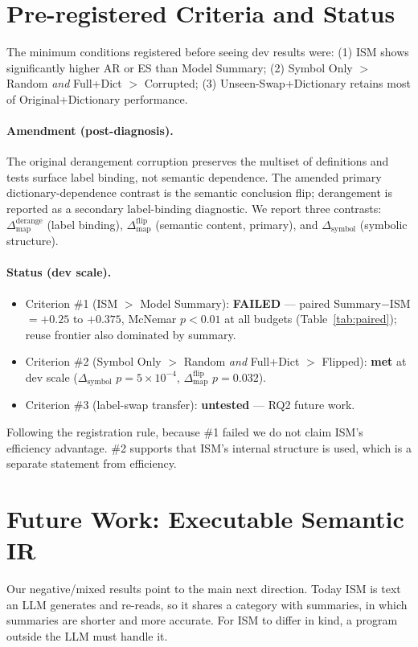 \documentclass{article}
\newcommand{\dmapder}{\ensuremath{\Delta_{\mathrm{map}}^{\mathrm{derange}}}}
\newcommand{\dmapflip}{\ensuremath{\Delta_{\mathrm{map}}^{\mathrm{flip}}}}
\newcommand{\dsym}{\ensuremath{\Delta_{\mathrm{symbol}}}}
\begin{document}
\appendix
\section{Pre-registered Criteria and Status}
\label{app:criteria}
The minimum conditions registered before seeing dev results were: (1) ISM shows
significantly higher AR or ES than Model Summary; (2) Symbol Only $>$ Random
\emph{and} Full+Dict $>$ Corrupted; (3) Unseen-Swap+Dictionary retains most of
Original+Dictionary performance.

\paragraph{Amendment (post-diagnosis).}
The original derangement corruption preserves the multiset of definitions and tests
surface label binding, not semantic dependence. The amended primary
dictionary-dependence contrast is the semantic conclusion flip; derangement is
reported as a secondary label-binding diagnostic. We report three contrasts:
\dmapder{} (label binding), \dmapflip{} (semantic content, primary), and \dsym{}
(symbolic structure).

\paragraph{Status (dev scale).}
\begin{itemize}
\item Criterion \#1 (ISM $>$ Model Summary): \textbf{FAILED} --- paired
Summary$-$ISM $=+0.25$ to $+0.375$, McNemar $p<0.01$ at all budgets
(Table~\ref{tab:paired}); reuse frontier also dominated by summary.
\item Criterion \#2 (Symbol Only $>$ Random \emph{and} Full+Dict $>$ Flipped):
\textbf{met} at dev scale (\dsym{} $p{=}5\!\times\!10^{-4}$, \dmapflip{} $p{=}0.032$).
\item Criterion \#3 (label-swap transfer): \textbf{untested} --- RQ2 future work.
\end{itemize}
Following the registration rule, because \#1 failed we do not claim ISM's
efficiency advantage. \#2 supports that ISM's internal structure is used, which is a
separate statement from efficiency.

\section{Future Work: Executable Semantic IR}
\label{app:future}
Our negative/mixed results point to the main next direction. Today ISM is text an
LLM generates and re-reads, so it shares a category with summaries, in which
summaries are shorter and more accurate. For ISM to differ in kind, a program
outside the LLM must handle it.
\end{document}
